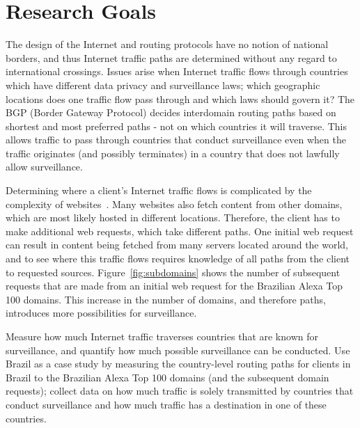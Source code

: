 \section{Research Goals}

The design of the Internet and routing protocols have no notion of national borders, and thus Internet traffic paths are determined without any regard to international crossings.  Issues arise when Internet traffic flows through countries which have different data privacy and surveillance laws; which geographic locations does one traffic flow pass through and which laws should govern it?  The BGP (Border Gateway Protocol) decides interdomain routing paths based on shortest and most preferred paths - not on which countries it will traverse.  This allows traffic to pass through countries that conduct surveillance even when the traffic originates (and possibly terminates) in a country that does not lawfully allow surveillance.  

Determining where a client's Internet traffic flows is complicated by the complexity of websites~\cite{}.  Many websites also fetch content from other domains, which are most likely hosted in different locations.  Therefore, the client has to make additional web requests, which take different paths.  One initial web request can result in content being fetched from many servers located around the world, and to see where this traffic flows requires knowledge of all paths from the client to requested sources.  Figure~\ref{fig:subdomains} shows the number of subsequent requests that are made from an initial web request for the Brazilian Alexa Top 100 domains.  This increase in the number of domains, and therefore paths, introduces more possibilities for surveillance.

\begin{thm}
Measure how much Internet traffic traverses countries that are known for surveillance, and quantify how much possible surveillance can be conducted.  Use Brazil as a case study by measuring the country-level routing paths for clients in Brazil to the Brazilian Alexa Top 100 domains (and the subsequent domain requests); collect data on how much traffic is solely transmitted by countries that conduct surveillance and how much traffic has a destination in one of these countries.
\end{thm}

